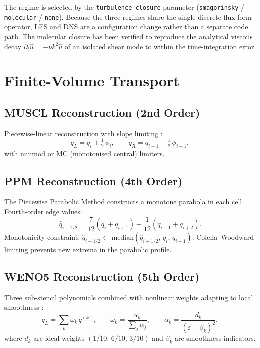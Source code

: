 \documentclass[11pt,twoside]{report}
\newcommand{\half}{\tfrac{1}{2}}
\begin{document}
The regime is selected by the \texttt{turbulence\_closure} parameter
(\texttt{smagorinsky} / \texttt{molecular} / \texttt{none}).  Because the
three regimes share the single discrete flux-form operator, LES and DNS are
a configuration change rather than a separate code path.  The molecular
closure has been verified to reproduce the analytical viscous decay
$\partial_t\hat u = -\nu k^2\hat u$ of an isolated shear mode to within the
time-integration error.


\section{Finite-Volume Transport}
\label{sec:fv-transport}

\subsection{MUSCL Reconstruction (2nd Order)}

Piecewise-linear reconstruction with slope limiting \citep{vanLeer1979}:
\begin{equation}
  q_L = q_i + \half\,\phi_i, \qquad q_R = q_{i+1} - \half\,\phi_{i+1},
\end{equation}
with minmod or MC (monotonised central) limiters.

\subsection{PPM Reconstruction (4th Order)}

The Piecewise Parabolic Method \citep{ColellaWoodward1984} constructs a
monotone parabola in each cell.  Fourth-order edge values:
\begin{equation}
  \hat q_{i+1/2} = \frac{7}{12}(q_i+q_{i+1})
  - \frac{1}{12}(q_{i-1}+q_{i+2}).
\end{equation}
Monotonicity constraint:
$\hat q_{i+1/2} \leftarrow \mathrm{median}(\hat q_{i+1/2},\,q_i,\,q_{i+1})$.
Colella--Woodward limiting prevents new extrema in the parabolic profile.

\subsection{WENO5 Reconstruction (5th Order)}

Three sub-stencil polynomials combined with nonlinear weights adapting to
local smoothness \citep{JiangShu1996}:
\begin{equation}
  q_L = \sum_k \omega_k\,q^{(k)}, \qquad
  \omega_k = \frac{\alpha_k}{\sum_j\alpha_j}, \qquad
  \alpha_k = \frac{d_k}{(\varepsilon+\beta_k)^2},
\end{equation}
where $d_k$ are ideal weights $(1/10,\,6/10,\,3/10)$ and $\beta_k$ are
smoothness indicators.
\end{document}
